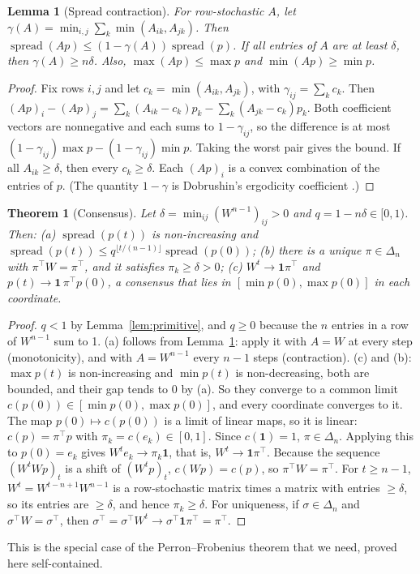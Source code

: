 \documentclass[11pt]{article}
\newtheorem{theorem}{Theorem}
\newtheorem{lemma}{Lemma}
\theoremstyle{definition}
\theoremstyle{remark}
\newcommand{\Simp}{\Delta}
\newcommand{\one}{\mathbf{1}}
\DeclareMathOperator{\spr}{spread}
\begin{document}
\begin{lemma}[Spread contraction]\label{lem:spread}
For row-stochastic $A$, let $\gamma(A)=\min_{i,j}\sum_k\min(A_{ik},A_{jk})$. Then $\spr(Ap)\le(1-\gamma(A))\spr(p)$. If all entries of $A$ are at least $\delta$, then $\gamma(A)\ge n\delta$. Also, $\max(Ap)\le\max p$ and $\min(Ap)\ge\min p$.
\end{lemma}
\begin{proof}
Fix rows $i,j$ and let $c_k=\min(A_{ik},A_{jk})$, with $\gamma_{ij}=\sum_kc_k$. Then $(Ap)_i-(Ap)_j=\sum_k(A_{ik}-c_k)p_k-\sum_k(A_{jk}-c_k)p_k$. Both coefficient vectors are nonnegative and each sums to $1-\gamma_{ij}$, so the difference is at most $(1-\gamma_{ij})\max p-(1-\gamma_{ij})\min p$. Taking the worst pair gives the bound. If all $A_{ik}\ge\delta$, then every $c_k\ge\delta$. Each $(Ap)_i$ is a convex combination of the entries of $p$. (The quantity $1-\gamma$ is Dobrushin's ergodicity coefficient \citep{dobrushin1956,seneta2006}.)
\end{proof}

\begin{theorem}[Consensus]\label{thm:degroot}
Let $\delta=\min_{ij}(W^{n-1})_{ij}>0$ and $q=1-n\delta\in[0,1)$. Then:
(a) $\spr(p(t))$ is non-increasing and $\spr(p(t))\le q^{\lfloor t/(n-1)\rfloor}\spr(p(0))$;
(b) there is a unique $\pi\in\Simp_n$ with $\pi^\top W=\pi^\top$, and it satisfies $\pi_k\ge\delta>0$;
(c) $W^t\to\one\pi^\top$ and $p(t)\to\one\,\pi^\top p(0)$, a consensus that lies in $[\min p(0),\max p(0)]$ in each coordinate.
\end{theorem}
\begin{proof}
$q<1$ by Lemma~\ref{lem:primitive}, and $q\ge0$ because the $n$ entries in a row of $W^{n-1}$ sum to 1. (a) follows from Lemma~\ref{lem:spread}: apply it with $A=W$ at every step (monotonicity), and with $A=W^{n-1}$ every $n-1$ steps (contraction). (c) and (b): $\max p(t)$ is non-increasing and $\min p(t)$ is non-decreasing, both are bounded, and their gap tends to $0$ by (a). So they converge to a common limit $c(p(0))\in[\min p(0),\max p(0)]$, and every coordinate converges to it. The map $p(0)\mapsto c(p(0))$ is a limit of linear maps, so it is linear: $c(p)=\pi^\top p$ with $\pi_k=c(e_k)\in[0,1]$. Since $c(\one)=1$, $\pi\in\Simp_n$. Applying this to $p(0)=e_k$ gives $W^te_k\to\pi_k\one$, that is, $W^t\to\one\pi^\top$. Because the sequence $(W^tWp)_t$ is a shift of $(W^tp)_t$, $c(Wp)=c(p)$, so $\pi^\top W=\pi^\top$. For $t\ge n-1$, $W^t=W^{t-n+1}W^{n-1}$ is a row-stochastic matrix times a matrix with entries $\ge\delta$, so its entries are $\ge\delta$, and hence $\pi_k\ge\delta$. For uniqueness, if $\sigma\in\Simp_n$ and $\sigma^\top W=\sigma^\top$, then $\sigma^\top=\sigma^\top W^t\to\sigma^\top\one\pi^\top=\pi^\top$.
\end{proof}
This is the special case of the Perron--Frobenius theorem \citep{perron1907,frobenius1912,seneta2006} that we need, proved here self-contained.
\end{document}
